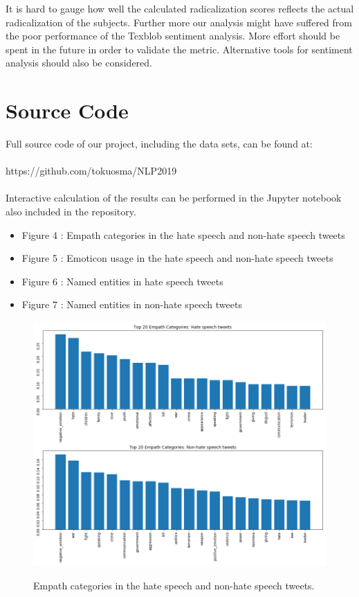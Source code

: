 \documentclass[conference]{IEEEtran}
\begin{document}
It is hard to gauge how well the calculated radicalization scores reflects the actual radicalization 
of the subjects. Further more our analysis might have suffered from the poor performance of the 
Texblob sentiment analysis. More effort should be spent in the future in order to validate the metric.
Alternative tools for sentiment analysis should also be considered.

\section*{Source Code} 
Full source code of our project, including the data sets, can be found at:
\\\\
https://github.com/tokuosma/NLP2019
\\\\
Interactive calculation of the results can be performed in the Jupyter notebook 
also included in the repository.



\vspace{12pt}

\appendix

\begin{itemize}
    \item Figure 4 : Empath categories in the hate speech and non-hate speech tweets 
    \item Figure 5 : Emoticon usage in the hate speech and non-hate speech tweets 
    \item Figure 6 : Named entities in hate speech tweets
    \item Figure 7 : Named entities in non-hate speech tweets
\end{itemize}

\begin{figure}[!t] 
\centering 
\includegraphics[width=5.0in]{liwc_topics} \label{fig:liwc_topics} \hfil 
\caption{Empath categories in the hate speech and non-hate speech tweets.}     
\end{figure} 
\end{document}
